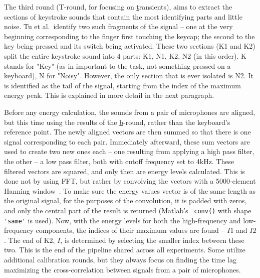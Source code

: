 \documentclass[../main.tex]{subfiles}
\begin{document}
The third round (T-round, for focusing on \underline{t}ransients), aims to
extract the sections of keystroke sounds that contain the most identifying
parts and little noise. Tu et al.\ identify two such fragments of the signal
-- one at the very beginning corresponding to the finger first touching the 
keycap; the second to the key being pressed and its switch being activated.
These two sections (K1 and K2) split the entire keystroke sound into 4 parts:
K1, N1, K2, N2  (in this order). K stands for "Key"
(as in important to the task, not something pressed on a keyboard), N for "Noisy".
However, the only section that is ever isolated is N2. It is identified as the tail
of the signal, starting from the index of the maximum energy peak.
This is explained in more detail in the next paragraph. 

Before any energy calculation, the sounds from a pair of microphones are aligned,
but this time using the results of the \underline{b}-round, rather than the
keyboard's reference point. The newly aligned vectors are then summed so that
there is one signal corresponding to each pair. Immediately afterward, these
sum vectors are used to create two new ones each -- one resulting
from applying a high pass filter, the other -- a low pass filter, both with cutoff
frequency set to 4kHz. These filtered vectors are squared, and only then are
energy levels calculated. This is done not by using FFT, but rather by convolving
the vectors with a 5000-element Hanning window~\cite{testa2004hanning-window}.
To make sure the energy values vector is of the same length as the original signal,
for the purposes of the convolution, it is padded with zeros, and only
the central part of the result is returned (Matlab's~\cite{MATLAB} \verb|conv()| with shape
\verb|'same'| is used). Now, with the energy levels for both the high-frequency
and low-frequency components, the indices of their maximum values are found
-- $I1$ and $I2$. The end of K2, $I$, is determined by selecting the smaller
index between these two.
This is the end of the pipeline shared across all experiments. Some 
utilize additional calibration rounds, but they always focus on finding the time lag maximizing 
the cross-correlation between signals from a pair of microphones.
\end{document}
